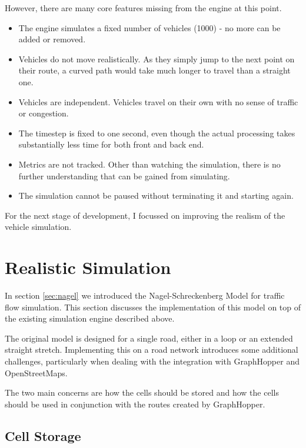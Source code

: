 \documentclass[ %
                    author={Alexander Hill},
                supervisor={Dr. Benjamin Sach},
                    degree={MEng},
                     title={MARMOSET: Multi Agent Real-time Multi-core Online
                     Simulation for Efficient Transportation},
                  subtitle={},
                      type={research},
                      year={2016} ]{dissertation}
\begin{document}
However, there are many core features missing from the engine at this point.

\begin{itemize}
    \item The engine simulates a fixed number of vehicles (1000) - no more can
        be added or removed.
    \item Vehicles do not move realistically. As they simply jump to the next
        point on their route, a curved path would take much longer to travel
        than a straight one.
    \item Vehicles are independent. Vehicles travel on their own with no sense
        of traffic or congestion.
    \item The timestep is fixed to one second, even though the actual processing
        takes substantially less time for both front and back end.
    \item Metrics are not tracked. Other than watching the simulation, there is
        no further understanding that can be gained from simulating.
    \item The simulation cannot be paused without terminating it and starting
        again.
\end{itemize}

For the next stage of development, I focussed on improving the realism of the
vehicle simulation.

\section{Realistic Simulation}

In section \ref{sec:nagel} we introduced the Nagel-Schreckenberg Model for
traffic flow simulation. This section discusses the implementation of this model
on top of the existing simulation engine described above.

The original model is designed for a single road, either in a loop or an extended
straight stretch. Implementing this on a road network introduces some additional
challenges, particularly when dealing with the integration with GraphHopper and
OpenStreetMaps.

The two main concerns are how the cells should be stored and how the cells
should be used in conjunction with the routes created by GraphHopper.

\subsection{Cell Storage}
\end{document}
